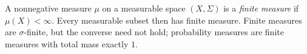 
A nonnegative measure $\mu$ on a measurable space $(X,\Sigma)$ is a \emph{finite measure} if $\mu(X)<\infty$. Every measurable subset then has finite measure. Finite measures are $\sigma$-finite, but the converse need not hold; probability measures are finite measures with total mass exactly $1$.
